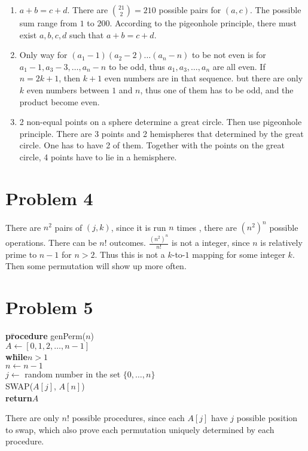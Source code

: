 \documentclass[letter]{article}
\newcommand{\aprocedure}{\textbf{pr}\=\+\textbf{ocedure}\xspace}
\newcommand{\awhile}{\textbf{wh}\=\+\textbf{ile}\xspace}
\newcommand{\aend}{\-\kill}
\newcommand{\areturn}{\textbf{return}\xspace}
\begin{document}
\begin{enumerate}
  \item
$a+b = c+d$. There are ${21 \choose 2} = 210$ possible pairs for $(a,c)$. The possible sum range from $1$ to $200$. According to the pigeonhole principle, there must exist $a,b,c,d$ such that $a+b = c+d$.
  \item
Only way for  $(a_1-1)(a_2-2)\ldots(a_n-n)$ to be not even is for $a_1-1,a_3-3,\ldots, a_n-n$ to be odd, thus $a_1,a_3,\ldots,a_n$ are all even. If $n=2k+1$, then $k+1$ even numbers are in that sequence. but there are only $k$ even numbers between $1$ and $n$, thus one of them has to be odd, and the product become even. 
  \item 2 non-equal points on a sphere determine a great circle.  Then use pigeonhole principle. There are 3 points and 2 hemispheres that determined by the great circle. One has to have 2 of them. Together with the points on the great circle, 4 points have to lie in a hemisphere. 
\end{enumerate}

\section*{Problem 4}
There are $n^2$ pairs of $(j,k)$, since it is run $n$ times , there are $(n^2)^n$ possible operations. There can be $n!$ outcomes. $\frac{(n^2)^n}{n!}$ is not a integer, since $n$ is relatively prime to $n-1$ for $n>2$. Thus this is not a $k$-to-$1$ mapping for some integer $k$. Then some permutation will show up more often.

\section*{Problem 5}
\begin{tabbing}
  \aprocedure genPerm($n$) \\
  $A \leftarrow [ 0, 1, 2, \ldots, n - 1 ]$ \\
  \awhile $n>1$ \\
    $n\gets n-1$\\
    $j \leftarrow$ random number in the set $\{0,\ldots,n\}$ \\
    SWAP($A[j]$, $A[n]$) \\
  \aend
  \areturn $A$
\end{tabbing}
There are only $n!$ possible procedures, since each $A[j]$ have $j$ possible position to swap, which also prove each permutation uniquely determined by each procedure.
\end{document}
